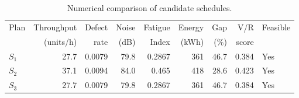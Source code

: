 \begin{table}[htbp]
\centering
\caption{Numerical comparison of candidate schedules.}
\label{tab:numerical-sim}
\small
\begin{tabular}{@{}lrrrrrrrl@{}}
\toprule
Plan & Throughput & Defect & Noise & Fatigue & Energy & Gap & V/R & Feasible \\
     & (units/h)  & rate   & (dB)  & Index   & (kWh)  & (\%) & score &         \\
\midrule
$S_{1}$ & 27.7 & 0.0079 & 79.8 & 0.2867 & 361 & 46.7 & 0.384 & Yes \\
$S_{2}$ & 37.1 & 0.0094 & 84.0 & 0.465 & 418 & 28.6 & 0.423 & Yes \\
$S_{3}$ & 27.7 & 0.0079 & 79.8 & 0.2867 & 361 & 46.7 & 0.384 & Yes \\
\bottomrule
\end{tabular}
\end{table}
